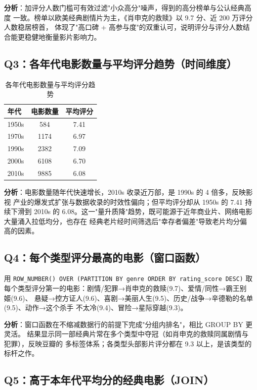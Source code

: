 \textbf{分析}：加评分人数门槛可有效过滤"小众高分"噪声，得到的高分榜单与公认经典高度
一致。榜单以欧美经典剧情片为主，《肖申克的救赎》以 9.7 分、近 200 万评分人数稳居榜首，
体现了"高口碑 + 高参与度"的双重认可，说明评分与评分人数结合能更稳健地衡量影片影响力。

\subsection{Q3：各年代电影数量与平均评分趋势（时间维度）}

\begin{table}[htbp]\centering
\caption{各年代电影数量与平均评分趋势}\label{tab:q3}
\begin{tabular}{lcc}
\toprule
年代 & 电影数量 & 平均评分 \\
\midrule
1950s & 584  & 7.41 \\
1970s & 1174 & 6.97 \\
1990s & 2382 & 7.09 \\
2000s & 6108 & 6.70 \\
2010s & 9885 & 6.08 \\
\bottomrule
\end{tabular}
\end{table}

\textbf{分析}：电影数量随年代快速增长，2010s 收录近万部，是 1990s 的 4 倍多，反映影视
产业的爆发式扩张与数据收录的时效性偏向；但平均评分却从 1950s 的 7.41 持续下滑到 2010s
的 6.08。这一"量升质降"趋势，既可能源于近年商业片、网络电影大量涌入拉低均分，也存在
经典老片经时间筛选后"幸存者偏差"导致老片均分偏高的因素。

\subsection{Q4：每个类型评分最高的电影（窗口函数）}

用 \lstinline!ROW_NUMBER() OVER (PARTITION BY genre ORDER BY rating_score DESC)!
取每个类型评分第一的电影：剧情/犯罪→肖申克的救赎(9.7)、爱情/同性→霸王别姬(9.6)、
悬疑→控方证人(9.6)、喜剧→美丽人生(9.5)、历史/战争→辛德勒的名单(9.5)、动作→这个杀手
不太冷(9.4)、冒险→星际穿越(9.3)。

\textbf{分析}：窗口函数在不缩减数据行的前提下完成"分组内排名"，相比 GROUP BY 更灵活。
结果显示同一部经典片常在多个类型中夺冠（如肖申克的救赎同属剧情与犯罪），反映豆瓣的
多标签体系；各类型头部影片评分都在 9.3 以上，是该类型的标杆之作。

\subsection{Q5：高于本年代平均分的经典电影（JOIN）}

